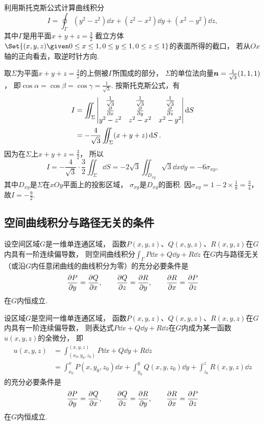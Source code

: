 \begin{example}
利用斯托克斯公式计算曲线积分\[
	I = \oint_\Gamma (y^2-z^2)\dd{x}+(z^2-x^2)\dd{y}+(x^2-y^2)\dd{z},
\]
其中\(\Gamma\)是用平面\(x+y+z=\frac32\)
截立方体\(\Set{(x,y,z)\given0\leq x\leq1,0\leq y\leq1,0\leq z\leq1}\)的表面所得的截口，
若从\(Ox\)轴的正向看去，取逆时针方向.
\begin{solution}
取\(\Sigma\)为平面\(x+y+z=\frac32\)的上侧被\(\Gamma\)所围成的部分，
\(\Sigma\)的单位法向量\(\boldsymbol{n}=\frac1{\sqrt3}(1,1,1)\)，
即\(\cos\alpha=\cos\beta=\cos\gamma=\frac1{\sqrt3}\).
按斯托克斯公式，有\begin{align*}
	I &= \iint_\Sigma \begin{vmatrix}
		\frac1{\sqrt3} & \frac1{\sqrt3} & \frac1{\sqrt3} \\
		\pdv{x} & \pdv{y} & \pdv{z} \\
		y^2-z^2 & z^2-x^2 & x^2-y^2
	\end{vmatrix} \dd{S} \\
	&= -\frac4{\sqrt3} \iint_\Sigma (x+y+z) \dd{S}.
\end{align*}
因为在\(\Sigma\)上\(x+y+z=\frac32\)，
所以\[
	I = -\frac4{\sqrt3} \cdot \frac32 \iint_\Sigma \dd{S}
	= -2\sqrt3 \iint_{D_{xy}} \sqrt3 \dd{x}\dd{y}
	= -6 \sigma_{xy},
\]
其中\(D_{xy}\)是\(\Sigma\)在\(xOy\)平面上的投影区域，
\(\sigma_{xy}\)是\(D_{xy}\)的面积.
因\(\sigma_{xy} = 1-2\times\frac18=\frac34\)，
故\(I=-\frac92\).
\end{solution}
\end{example}

\subsection{空间曲线积分与路径无关的条件}
\begin{theorem}\label{theorem:线积分与面积分.空间曲线积分与路径无关的条件}
设空间区域\(G\)是一维单连通区域，
函数\(P(x,y,z)\)、\(Q(x,y,z)\)、\(R(x,y,z)\)在\(G\)内具有一阶连续偏导数，
则空间曲线积分\(\int_\Gamma P\dd{x}+Q\dd{y}+R\dd{z}\)
在\(G\)内与路径无关（或沿\(G\)内任意闭曲线的曲线积分为零）的充分必要条件是\[
	\pdv{P}{y}=\pdv{Q}{x}, \qquad
	\pdv{Q}{z}=\pdv{R}{y}, \qquad
	\pdv{R}{x}=\pdv{P}{z}
\]在\(G\)内恒成立.
\end{theorem}

\begin{theorem}
设区域\(G\)是空间一维单连通区域，
函数\(P(x,y,z)\)、\(Q(x,y,z)\)、\(R(x,y,z)\)在\(G\)内具有一阶连续偏导数，
则表达式\(P\dd{x}+Q\dd{y}+R\dd{z}\)在\(G\)内成为某一函数\(u(x,y,z)\)的全微分，
即\begin{align*}
	u(x,y,z)
	&= \int_{(x_0,y_0,z_0)}^{(x,y,z)}
	P\dd{x}+Q\dd{y}+R\dd{z} \\
	&= \int_{x_0}^x P(x,y_0,z_0) \dd{x}
	+ \int_{y_0}^y Q(x,y,z_0) \dd{y}
	+ \int_{z_0}^z R(x,y,z) \dd{z}
\end{align*}的充分必要条件是\[
	\pdv{P}{y}=\pdv{Q}{x}, \qquad
	\pdv{Q}{z}=\pdv{R}{y}, \qquad
	\pdv{R}{x}=\pdv{P}{z}
\]在\(G\)内恒成立.
\end{theorem}

